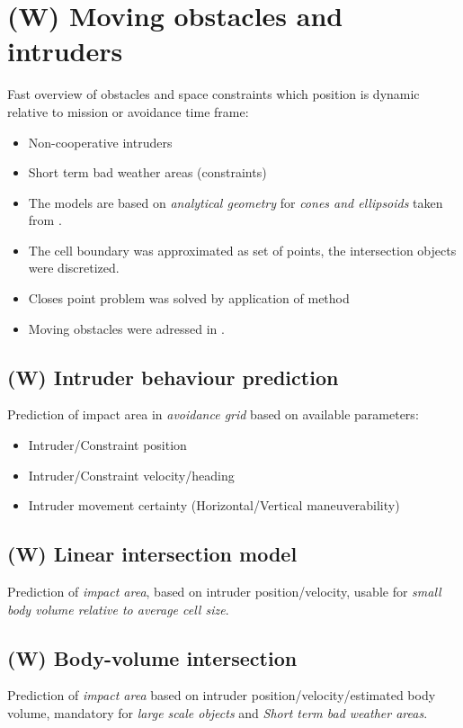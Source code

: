 \section{(W) Moving obstacles and intruders}\label{s:intruders}
    \noindent Fast overview of obstacles and space constraints which position is dynamic relative to mission or avoidance time frame:
    \begin{itemize}
        \item Non-cooperative intruders
        \item Short term bad weather areas (constraints)
        \item The models are based on \emph{analytical geometry} for \emph{cones and ellipsoids} taken from \cite{sommerville2016analytical}.
        \item The cell boundary was approximated as set of points, the intersection objects were discretized.
        \item Closes point problem \cite{shamos1975closest} was solved by application of method  \cite{bentley1980optimal}
		\item Moving obstacles were adressed in \cite{fiorini1998motion}.
    \end{itemize}
    
\subsection{(W) Intruder behaviour prediction}\label{s:intruderBehaviourPrediction}
    \noindent Prediction of impact area in \emph{avoidance grid} based on available parameters:
    \begin{itemize}
        \item Intruder/Constraint position
        \item Intruder/Constraint velocity/heading
        \item Intruder movement certainty (Horizontal/Vertical maneuverability)
    \end{itemize}
    
\subsection{(W) Linear intersection model}\label{s:linearIntersectionModel}
    \noindent Prediction of \emph{impact area}, based on intruder position/velocity, usable for \emph{small body volume relative to average cell size}.
    
\subsection{(W) Body-volume intersection}\label{s:bodyvolumeIntersection}
    \noindent Prediction of \emph{impact area} based on intruder position/velocity/estimated body volume, mandatory for \emph{large scale objects} and \emph{Short term bad weather areas}.
    
